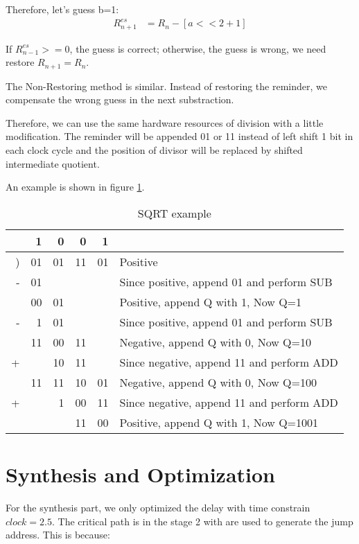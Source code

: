 Therefore, let's guess b=1:
\begin{align*}
R_{n+1}^{es} &= R_{n} - [a<<2 + 1]
\end{align*}

If $R_{n-1}^{es}>=0$, the guess is correct; otherwise, the guess is wrong, we need
restore $R_{n+1}=R_{n}$.

The Non-Restoring method is similar. Instead of restoring the reminder, we compensate
the wrong guess in the next substraction.

Therefore, we can use the same hardware resources of division with a little modification. The reminder
will be appended 01 or 11 instead of left shift 1 bit in each clock cycle and the position of divisor
will be replaced by shifted intermediate quotient.

An example is shown in figure \ref{tab:sqrt}.

\begin{table}[!ht]
\centering
\caption{SQRT example}
\label{tab:sqrt}
\begin{tabular}{rrrrr l}
  &  1 &  0 &  0 &  1 & \\
\hline
) & 01 & 01 & 11 & 01 & Positive\\
- & 01 &    &    &    & Since positive, append 01 and perform SUB\\
\hline
  & 00 & 01 &    &    & Positive, append Q with 1, Now Q=1\\
- &  1 & 01 &    &    & Since positive, append 01 and perform SUB\\
\hline
  & 11 & 00 & 11 &    & Negative, append Q with 0, Now Q=10\\
+ &    & 10 & 11 &    & Since negative, append 11 and perform ADD\\
\hline
  & 11 & 11 & 10 & 01 & Negative, append Q with 0, Now Q=100\\
+ &    &  1 & 00 & 11 & Since negative, append 11 and perform ADD\\
\hline
  &    &    & 11 & 00 & Positive, append Q with 1, Now Q=1001\\
\end{tabular}
\end{table}


\chapter[Synthesis and Optimization]{Synthesis and Optimization}
For the synthesis part, we only optimized the delay with time constrain $clock=2.5$.
The critical path is in the stage 2 with are used to generate the jump address. This
is because:

